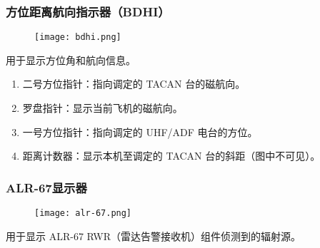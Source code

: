 \subsubsection{方位距离航向指示器（BDHI）}

\begin{figure}[htb]
	\centering
	\texttt{[image: bdhi.png]}
\end{figure}
用于显示方位角和航向信息。

\begin{enumerate}
	\item 二号方位指针：指向调定的 TACAN 台的磁航向。
	\item 罗盘指针：显示当前飞机的磁航向。
	\item 一号方位指针：指向调定的 UHF/ADF 电台的方位。
	\item 距离计数器：显示本机至调定的 TACAN 台的斜距（图中不可见）。
\end{enumerate}

\subsubsection{ALR-67显示器}

\begin{figure}[htb]
	\centering
	\texttt{[image: alr-67.png]}
\end{figure}
用于显示 ALR-67 RWR（雷达告警接收机）组件侦测到的辐射源。

